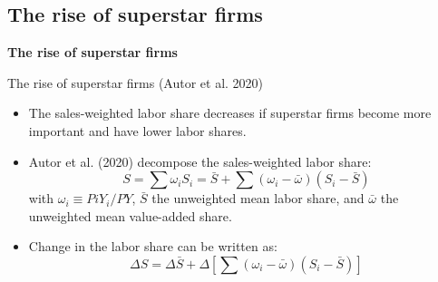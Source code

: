 \documentclass[notes=show]{beamer}
\begin{document}
\subsection*{The rise of superstar firms}

\begin{frame}
	\centering
	\textbf{The rise of superstar firms}
\end{frame}

\begin{frame}{The rise of superstar firms (Autor et al. 2020)}
\begin{itemize}
\item The sales-weighted labor share decreases if superstar firms become more important and have lower labor shares. \medskip
\item Autor et al. (2020) decompose the sales-weighted labor share:
\begin{equation*}
    S = \sum \omega_{i} S_{i} = \bar{S} + \sum (\omega_{i} - \bar{\omega})(S_{i}-\bar{S}) \tag{ADKPR-3}
\end{equation*}
with $ \omega_{i} \equiv P{i}Y_{i}/PY$, $\bar{S}$ the unweighted mean labor share, and $\bar{\omega}$ the unweighted mean value-added share. \medskip
\item Change in the labor share can be written as:
\begin{equation*}
    \Delta S = \Delta \bar{S} + \Delta \left[ \sum (\omega_{i} - \bar{\omega})(S_{i}-\bar{S}) \right] \tag{ADKPR-4}
\end{equation*}
\end{itemize}
\end{frame}
\end{document}
